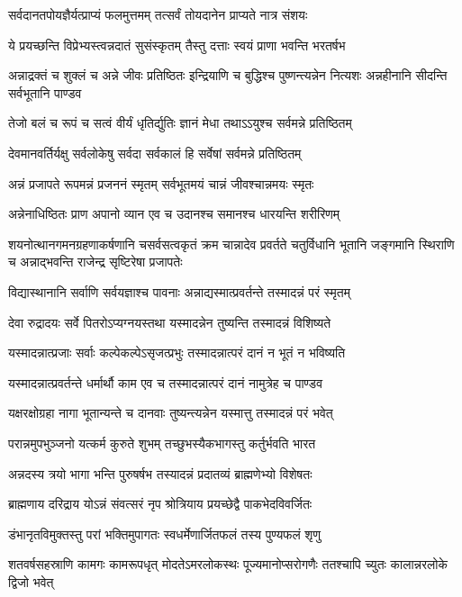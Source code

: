 \twolineshloka
{सर्वदानतपोयज्ञैर्यत्प्राप्यं फलमुत्तमम्}
{तत्सर्वं तोयदानेन प्राप्यते नात्र संशयः}


\twolineshloka
{ये प्रयच्छन्ति विप्रेभ्यस्त्वन्नदातं सुसंस्कृतम्}
{तैस्तु दत्ताः स्वयं प्राणा भवन्ति भरतर्षभ}


\threelineshloka
{अन्नाद्रक्तं च शुक्लं च अन्ने जीवः प्रतिष्ठितः}
{इन्द्रियाणि च बुद्धिश्च पुष्णन्त्यन्नेन नित्यशः}
{अन्नहीनानि सीदन्ति सर्वभूतानि पाण्डव}


\twolineshloka
{तेजो बलं च रूपं च सत्वं वीर्यं धृतिर्द्युतिः}
{ज्ञानं मेधा तथाऽऽयुश्च सर्वमन्ने प्रतिष्ठितम्}


\twolineshloka
{देवमानवर्तिर्यक्षु सर्वलोकेषु सर्वदा}
{सर्वकालं हि सर्वेषां सर्वमन्ने प्रतिष्ठितम्}


\twolineshloka
{अन्नं प्रजापते रूपमन्नं प्रजननं स्मृतम्}
{सर्वभूतमयं चान्नं जीवश्चान्नमयः स्मृतः}


\twolineshloka
{अन्नेनाधिष्ठितः प्राण अपानो व्यान एव च}
{उदानश्च समानश्च धारयन्ति शरीरिणम्}


शयनोत्थानगमनग्रहणाकर्षणानि चसर्वसत्वकृतं क्रम चान्नादेव प्रवर्तते
\twolineshloka
{चतुर्विधानि भूतानि जङ्गमानि स्थिराणि च}
{अन्नाद्भवन्ति राजेन्द्र सृष्टिरेषा प्रजापतेः}


\twolineshloka
{विद्यास्थानानि सर्वाणि सर्वयज्ञाश्च पावनाः}
{अन्नाद्यस्मात्प्रवर्तन्ते तस्मादन्नं परं स्मृतम्}


\twolineshloka
{देवा रुद्रादयः सर्वे पितरोऽप्यग्नयस्तथा}
{यस्मादन्नेन तुष्यन्ति तस्मादन्नं विशिष्यते}


\twolineshloka
{यस्मादन्नात्प्रजाः सर्वाः कल्पेकल्पेऽसृजत्प्रभुः}
{तस्मादन्नात्परं दानं न भूतं न भविष्यति}


\twolineshloka
{यस्मादन्नात्प्रवर्तन्ते धर्मार्थौ काम एव च}
{तस्मादन्नात्परं दानं नामुत्रेह च पाण्डव}


\twolineshloka
{यक्षरक्षोग्रहा नागा भूतान्यन्ते च दानवाः}
{तुष्यन्त्यन्नेन यस्मात्तु तस्मादन्नं परं भवेत्}


\twolineshloka
{परान्नमुपभुञ्जनो यत्कर्म कुरुते शुभम्}
{तच्छुभस्यैकभागस्तु कर्तुर्भवति भारत}


\twolineshloka
{अन्नदस्य त्रयो भागा भन्ति पुरुषर्षभ}
{तस्यादन्नं प्रदातव्यं ब्राह्मणेभ्यो विशेषतः}


\twolineshloka
{ब्राह्मणाय दरिद्राय योऽन्नं संवत्सरं नृप}
{श्रोत्रियाय प्रयच्छेद्वै पाकभेदविवर्जितः}


\twolineshloka
{डंभानृतविमुक्तस्तु परां भक्तिमुपागतः}
{स्वधर्मेणार्जितफलं तस्य पुण्यफलं शृणु}


\threelineshloka
{शतवर्षसहस्राणि कामगः कामरूपधृत्}
{मोदतेऽमरलोकस्थः पूज्यमानोप्सरोगणैः}
{ततश्चापि च्युतः कालान्नरलोके द्विजो भवेत्}


